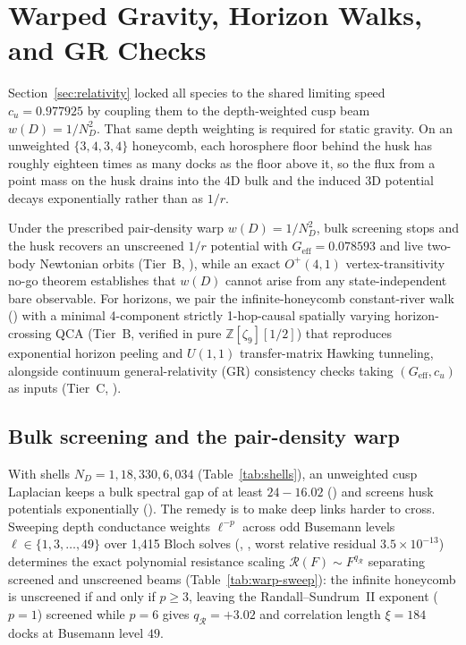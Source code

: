 \section{Warped Gravity, Horizon Walks, and GR Checks}
\label{sec:gravity}

Section~\ref{sec:relativity} locked all species to the shared limiting speed $c_u = 0.977925$ by coupling them to the
depth-weighted cusp beam $w(D) = 1/N_D^2$. That same depth weighting is required for static gravity. On an unweighted
$\{3,4,3,4\}$ honeycomb, each horosphere floor behind the husk has roughly eighteen times as many docks as the floor
above it, so the flux from a point mass on the husk drains into the 4D bulk and the induced 3D potential decays
exponentially rather than as $1/r$.

Under the prescribed pair-density warp $w(D) = 1/N_D^2$, bulk screening stops and the husk recovers an unscreened
$1/r$ potential with $G_{\mathrm{eff}} = 0.078593$ and live two-body Newtonian orbits (Tier~B,
), while an exact $O^+(4,1)$ vertex-transitivity no-go theorem establishes that $w(D)$
cannot arise from any state-independent bare observable. For horizons, we pair the infinite-honeycomb constant-river
walk () with a minimal 4-component strictly 1-hop-causal spatially varying horizon-crossing QCA
(Tier~B, verified in pure  $\mathbb{Z}[\zeta_9][1/2]$) that reproduces exponential horizon peeling and
$U(1,1)$ transfer-matrix Hawking tunneling, alongside continuum general-relativity (GR) consistency checks taking
$(G_{\mathrm{eff}}, c_u)$ as inputs (Tier~C, ).

\subsection{Bulk screening and the pair-density warp}

With shells $N_D = 1, 18, 330, 6{,}034$ (Table~\ref{tab:shells}), an unweighted cusp Laplacian keeps a bulk spectral
gap of at least $24 - 16.02$ () and screens husk potentials exponentially (). The
remedy is to make deep links harder to cross. Sweeping depth conductance weights $\ell^{-p}$ across odd Busemann levels
$\ell \in \{1, 3, \ldots, 49\}$ over 1,415 Bloch solves (, , worst relative residual
$3.5 \times 10^{-13}$) determines the exact polynomial resistance scaling $\mathcal{R}(F) \sim F^{q_{\mathcal{R}}}$
separating screened and unscreened beams (Table~\ref{tab:warp-sweep}): the infinite honeycomb is unscreened if and
only if $p \ge 3$, leaving the Randall--Sundrum~II exponent ($p = 1$) \cite{randall1999} screened while $p = 6$ gives
$q_{\mathcal{R}} = +3.02$ and correlation length $\xi = 184$ docks at Busemann level $49$.

